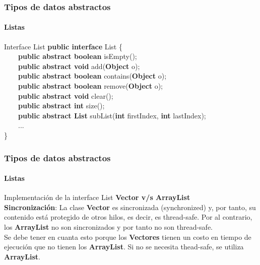 \documentclass{beamer}
\begin{document}
		\begin{frame}
			\frametitle{Tipos de datos abstractos}
			\framesubtitle{Listas}

			\begin{block}{Interface List}
				\textbf{public interface} List \{ \\
				\ \ \ \ \textbf{public abstract boolean} isEmpty(); \\
				\ \ \ \ \textbf{public abstract void} add(\textbf{Object} o); \\
				\ \ \ \ \textbf{public abstract boolean} contains(\textbf{Object} o); \\
				\ \ \ \ \textbf{public abstract boolean} remove(\textbf{Object} o); \\
				\ \ \ \ \textbf{public abstract void} clear(); \\
				\ \ \ \ \textbf{public abstract int} size(); \\
				\ \ \ \ \textbf{public abstract List} subList(\textbf{int} firstIndex, \textbf{int} lastIndex); \\
				\ \ \ \ ... \\
				\}
			\end{block}
		\end{frame}

		\begin{frame}
			\frametitle{Tipos de datos abstractos}
			\framesubtitle{Listas}

			\begin{block}{Implementaci\'on de la interface List}
				\textbf{Vector v/s ArrayList } \\
				\textbf{Sincronizaci\'on}: La clase \textbf{Vector} es sincronizada (synchronized) y, por tanto, su contenido est\'a protegido de otros hilos, es decir, es thread-safe. Por al contrario, los \textbf{ArrayList} no son sincronizados y por tanto no son thread-safe. \\
				Se debe tener en cuanta esto porque los \textbf{Vectores} tienen un costo en tiempo de ejecuci\'on que no tienen los \textbf{ArrayList}. Si no se necesita thead-safe, se utiliza \textbf{ArrayList}.
			\end{block}
		\end{frame}
\end{document}
